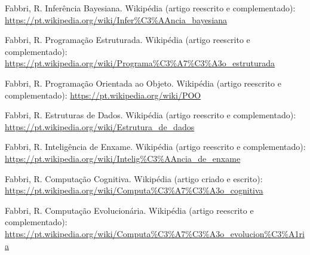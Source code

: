 \documentclass[a4paper, 11pt]{article}
\begin{document}
\begin{thebibliography}{99}
  Fabbri, R. Inferência Bayesiana. Wikipédia (artigo reescrito e complementado): \url{https://pt.wikipedia.org/wiki/Infer%C3%AAncia_bayesiana}

  Fabbri, R. Programação Estruturada. Wikipédia (artigo reescrito e complementado): \url{https://pt.wikipedia.org/wiki/Programa%C3%A7%C3%A3o_estruturada}

  Fabbri, R. Programação Orientada ao Objeto. Wikipédia (artigo reescrito e complementado): \url{https://pt.wikipedia.org/wiki/POO}

  Fabbri, R. Estruturas de Dados. Wikipédia (artigo reescrito e complementado): \url{https://pt.wikipedia.org/wiki/Estrutura_de_dados}

  Fabbri, R. Inteligência de Enxame. Wikipédia (artigo reescrito e complementado): \url{https://pt.wikipedia.org/wiki/Intelig%C3%AAncia_de_enxame}

  Fabbri, R. Computação Cognitiva. Wikipédia (artigo criado e escrito): \url{https://pt.wikipedia.org/wiki/Computa%C3%A7%C3%A3o_cognitiva}

  Fabbri, R. Computação Evolucionária. Wikipédia (artigo reescrito e complementado): \url{https://pt.wikipedia.org/wiki/Computa%C3%A7%C3%A3o_evolucion%C3%A1ria}


\end{thebibliography}
\end{document}

